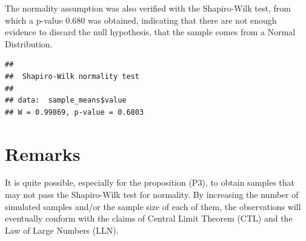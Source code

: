 \documentclass[
]{article}
\begin{document}
       The normality assumption was also verified with the Shapiro-Wilk
       test, from which a p-value 0.680 was obtained, indicating that
       there are not enough evidence to discard the null hypothesis,
       that the sample comes from a Normal Distribution.

\begin{verbatim}
## 
##  Shapiro-Wilk normality test
## 
## data:  sample_means$value
## W = 0.99869, p-value = 0.6803
\end{verbatim}

       \hypertarget{remarks}{%
       \section{Remarks}\label{remarks}}

       It is quite possible, especially for the proposition (P3), to
       obtain samples that may not pass the Shapiro-Wilk test for
       normality. By increasing the number of simulated samples and/or
       the sample size of each of them, the observations will eventually
       conform with the claims of Central Limit Theorem (CTL) and the
       Law of Large Numbers (LLN).
	
				
\end{document}
